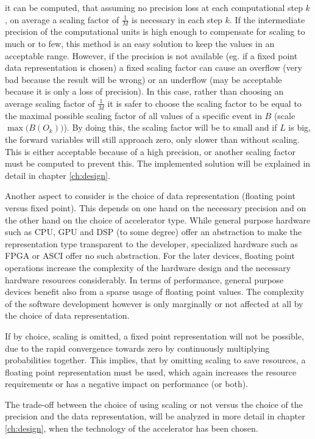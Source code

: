\documentclass[mscthesis]{usiinfthesis}
\begin{document}
it can be computed, that assuming no precision loss at each computational step
$k$, on average a scaling factor of $\frac{1}{M}$ is necessary in each step
$k$. If the intermediate precision of the computational units is high enough to
compensate for scaling to much or to few, this method is an easy solution to
keep the values in an acceptable range. However, if the precision is not
available (eg. if a fixed point data representation is chosen) a fixed scaling
factor can cause an overflow (very bad because the result will be wrong) or an
underflow (may be acceptable because it is only a loss of precision). In this
case, rather than choosing an average scaling factor of $\frac{1}{M}$ it is
safer to choose the scaling factor to be equal to the maximal possible scaling
factor of all values of a specific event in $B$ (scale $\max\big(B(O_k)\big)$).
By doing this, the scaling factor will be to small and if $L$ is big, the
forward variables will still approach zero, only slower than without scaling.
This is either acceptable because of a high precision, or another scaling
factor must be computed to prevent this. The implemented solution will be
explained in detail in chapter \ref{ch:design}.

Another aspect to consider is the choice of data representation (floating point
versus fixed point). This depends on one hand on the necessary precision and on
the other hand on the choice of accelerator type.  While general purpose
hardware such as CPU, GPU and DSP (to some degree) offer an abstraction to make
the representation type transparent to the developer, specialized hardware such
as FPGA or ASCI offer no such abstraction. For the later devices, floating
point operations increase the complexity of the hardware design and the
necessary hardware resources considerably. In terms of performance, general
purpose devices benefit also from a sparse usage of floating point values. The
complexity of the software development however is only marginally or not
affected at all by the choice of data representation.

If by choice, scaling is omitted, a fixed point representation will not be
possible, due to the rapid convergence towards zero by continuously multiplying
probabilities together. This implies, that by omitting scaling to save
resources, a floating point representation must be used, which again increases
the resource requirements or has a negative impact on performance (or both).

The trade-off between the choice of using scaling or not versus the choice of
the precision and the data representation, will be analyzed in more detail in
chapter \ref{ch:design}, when the technology of the accelerator has been
chosen.
\end{document}

